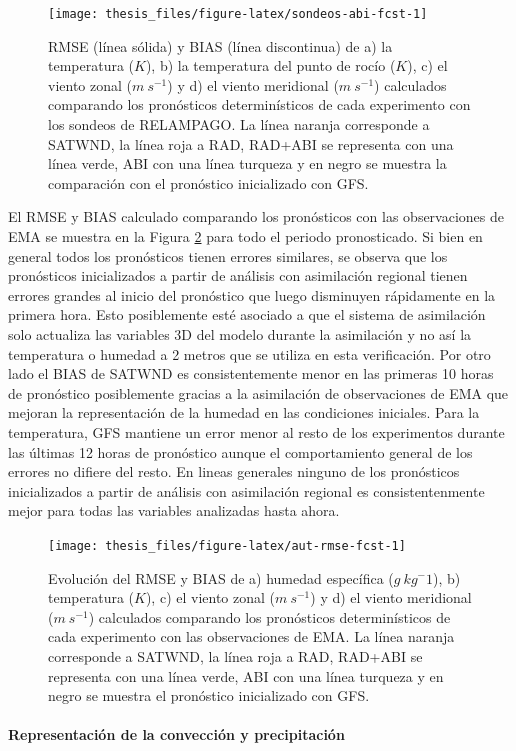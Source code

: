 \documentclass[12pt,oneside,a4paper]{reedthesis}
\begin{document}
\begin{figure}

{\centering \texttt{[image: thesis\_files/figure-latex/sondeos-abi-fcst-1]} 

}

\caption{RMSE (línea sólida) y BIAS (línea discontinua) de a) la temperatura (\(K\)), b) la temperatura del punto de rocío (\(K\)), c) el viento zonal (\(m\ s^{-1}\)) y d) el viento meridional (\(m\ s^{-1}\)) calculados comparando los pronósticos determinísticos de cada experimento con los sondeos de RELAMPAGO. La línea naranja corresponde a SATWND, la línea roja a RAD, RAD+ABI se representa con una línea verde, ABI con una línea turqueza y en negro se muestra la comparación con el pronóstico inicializado con GFS.}\label{fig:sondeos-abi-fcst}
\end{figure}
El RMSE y BIAS calculado comparando los pronósticos con las observaciones de EMA se muestra en la Figura \ref{fig:aut-rmse-fcst} para todo el periodo pronosticado. Si bien en general todos los pronósticos tienen errores similares, se observa que los pronósticos inicializados a partir de análisis con asimilación regional tienen errores grandes al inicio del pronóstico que luego disminuyen rápidamente en la primera hora. Esto posiblemente esté asociado a que el sistema de asimilación solo actualiza las variables 3D del modelo durante la asimilación y no así la temperatura o humedad a 2 metros que se utiliza en esta verificación. Por otro lado el BIAS de SATWND es consistentemente menor en las primeras 10 horas de pronóstico posiblemente gracias a la asimilación de observaciones de EMA que mejoran la representación de la humedad en las condiciones iniciales. Para la temperatura, GFS mantiene un error menor al resto de los experimentos durante las últimas 12 horas de pronóstico aunque el comportamiento general de los errores no difiere del resto. En lineas generales ninguno de los pronósticos inicializados a partir de análisis con asimilación regional es consistentenmente mejor para todas las variables analizadas hasta ahora.


\begin{figure}

{\centering \texttt{[image: thesis\_files/figure-latex/aut-rmse-fcst-1]} 

}

\caption{Evolución del RMSE y BIAS de a) humedad específica (\(g\ kg{^-1}\)), b) temperatura (\(K\)), c) el viento zonal (\(m\ s^{-1}\)) y d) el viento meridional (\(m\ s^{-1}\)) calculados comparando los pronósticos determinísticos de cada experimento con las observaciones de EMA. La línea naranja corresponde a SATWND, la línea roja a RAD, RAD+ABI se representa con una línea verde, ABI con una línea turqueza y en negro se muestra el pronóstico inicializado con GFS.}\label{fig:aut-rmse-fcst}
\end{figure}
\hypertarget{representaciuxf3n-de-la-convecciuxf3n-y-precipitaciuxf3n}{%
\paragraph{Representación de la convección y precipitación}\label{representaciuxf3n-de-la-convecciuxf3n-y-precipitaciuxf3n}}
\end{document}
